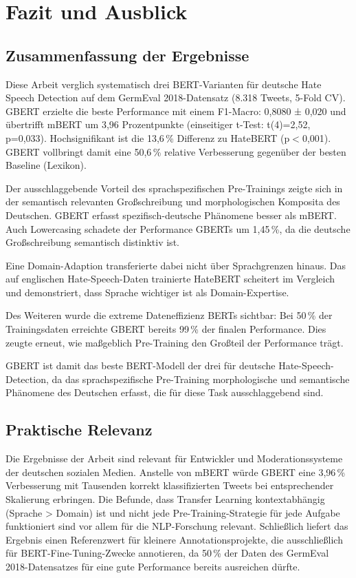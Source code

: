 ﻿\documentclass[11pt,a4paper]{article}
\begin{document}
\section{Fazit und Ausblick}

\subsection{Zusammenfassung der Ergebnisse}

Diese Arbeit verglich systematisch drei BERT-Varianten für deutsche Hate Speech Detection auf dem GermEval 2018-Datensatz (8.318 Tweets, 5-Fold CV). GBERT erzielte die beste Performance mit einem F1-Macro: 0,8080 ± 0,020 und übertrifft mBERT um 3,96 Prozentpunkte (einseitiger t-Test: t(4)=2{,}52, p=0{,}033). Hochsignifikant ist die 13,6\,\% Differenz zu HateBERT (p$<$0{,}001). GBERT vollbringt damit eine 50,6\,\% relative Verbesserung gegenüber der besten Baseline (Lexikon). 

Der ausschlaggebende Vorteil des sprachspezifischen Pre-Trainings zeigte sich in der semantisch relevanten Großschreibung und morphologischen Komposita des Deutschen. GBERT erfasst spezifisch-deutsche Phänomene besser als mBERT. Auch Lowercasing schadete der Performance GBERTs um 1{,}45\,\%, da die deutsche Großschreibung semantisch distinktiv ist. 

Eine Domain-Adaption transferierte dabei nicht über Sprachgrenzen hinaus. Das auf englischen Hate-Speech-Daten trainierte HateBERT scheitert im Vergleich und demonstriert, dass Sprache wichtiger ist als Domain-Expertise.

Des Weiteren wurde die extreme Dateneffizienz BERTs sichtbar: Bei 50\,\% der Trainingsdaten erreichte GBERT bereits 99\,\% der finalen Performance. Dies zeugte erneut, wie maßgeblich Pre-Training den Großteil der Performance trägt. 

GBERT ist damit das beste BERT-Modell der drei für deutsche Hate-Speech-Detection, da das sprachspezifische Pre-Training morphologische und semantische Phänomene des Deutschen erfasst, die für diese Task ausschlaggebend sind.



\subsection{Praktische Relevanz}

Die Ergebnisse der Arbeit sind relevant für Entwickler und Moderationssysteme der deutschen sozialen Medien. Anstelle von mBERT würde GBERT eine 3,96\,\% Verbesserung mit Tausenden korrekt klassifizierten Tweets bei entsprechender Skalierung erbringen. 
Die Befunde, dass Transfer Learning kontextabhängig (Sprache > Domain) ist und nicht jede Pre-Training-Strategie für jede Aufgabe funktioniert sind vor allem für die NLP-Forschung relevant.
Schließlich liefert das Ergebnis einen Referenzwert für kleinere Annotationsprojekte, die ausschließlich für BERT-Fine-Tuning-Zwecke annotieren, da 50\,\% der Daten des GermEval 2018-Datensatzes für eine gute Performance bereits ausreichen dürfte. 
\end{document}
